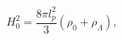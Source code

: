 \begin{equation}
H_{0}^{2}=\frac{8\pi l_{p}^{2}}{3}\left( \rho _{0}+\rho _{\Lambda }\right) ,
\end{equation}


